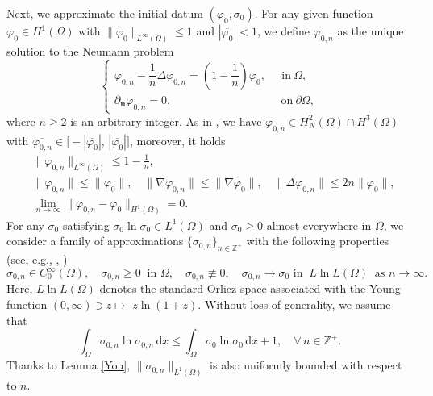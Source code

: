 \documentclass[11pt,reqno]{amsart}
\begin{document}
Next, we approximate the initial datum $(\varphi_0, \sigma_0)$.
For any given function $\varphi_{0}\in H^1(\Omega)$ with $\|  \varphi_{0} \|_{L^{\infty}(\Omega)} \le 1$ and $|\overline{\varphi_{0}}|<1$,
we define $\varphi_{0,n}$ as the unique solution to the Neumann problem
%
\begin{equation*}
\begin{cases}
 \varphi_{0,n} - \dfrac{1}{n} \Delta \varphi_{0,n}= \left(1-\dfrac{1}{n}\right) \varphi_{0}, \, \ \quad \text{in}\ \Omega,
 \\
  \partial_{\bm{n}}  \varphi_{0,n} =0,  \qquad  \qquad \qquad \qquad \quad \ \ \ \text{on}\ \partial\Omega,
\end{cases}
\end{equation*}
where $n\geq 2$ is an arbitrary integer. As in \cite{GHW1}, we have
$\varphi_{0,n}\in H^2_N(\Omega)\cap H^3(\Omega)$ with $\overline{\varphi_{0,n}} \in \big[-|\overline{\varphi_{0}}|,\,|\overline{\varphi_{0}}|\big]$,
moreover, it holds
\begin{align}
&\|  \varphi_{0,n} \|_{L^\infty(\Omega)} \le 1-\frac{1}{n},
\label{Lvp1k}
\\
&\|\varphi_{0,n}\| \leq \|\varphi_0\|,\quad  \|\nabla \varphi_{0,n}\| \leq \|\nabla \varphi_0\|,\quad
\|\Delta \varphi_{0,n}\|\leq 2n \|\varphi_0\|,
\label{Lvp2k}
\\
&\lim_{n\to \infty}\|\varphi_{0,n}-\varphi_{0}\|_{H^1(\Omega)} =0.
\label{Lvp3k}
\end{align}
%
For any $\sigma_0$ satisfying $\sigma_0\ln \sigma_0\in L^1(\Omega)$ and $\sigma_0\geq 0$ almost everywhere in $\Omega$, we consider a family of approximations $\{\sigma_{0,n}\}_{n\in \mathbb{Z}^+}$ with the following properties (see, e.g., \cite{ad2003}, \cite[Section 2.2]{W2016})
$$
\sigma_{0,n} \in C^{\infty}_0(\Omega),  \quad \sigma_{0,n}\ge 0 \ \text { in } \Omega,\quad \sigma_{0,n}\not\equiv 0,\quad
\sigma_{0,n} \rightarrow \sigma_0 \text { in }\ L \ln L(\Omega) \ \text { as } n\to \infty.
$$
Here, $L \ln L(\Omega)$ denotes the standard Orlicz space associated with the Young function $(0, \infty) \ni z \mapsto$ $z \ln (1+z)$. Without loss of generality, we assume that
$$  \int_\Omega \sigma_{0,n}\ln \sigma_{0,n}\,\mathrm{d}x \leq \int_\Omega \sigma_{0}\ln \sigma_{0}\,\mathrm{d}x+1,\quad
\forall\,n\in \mathbb{Z}^+.
$$
Thanks to Lemma \ref{You}, $\|\sigma_{0,n}\|_{L^1(\Omega)}$ is also uniformly bounded with respect to $n$.
\end{document}
